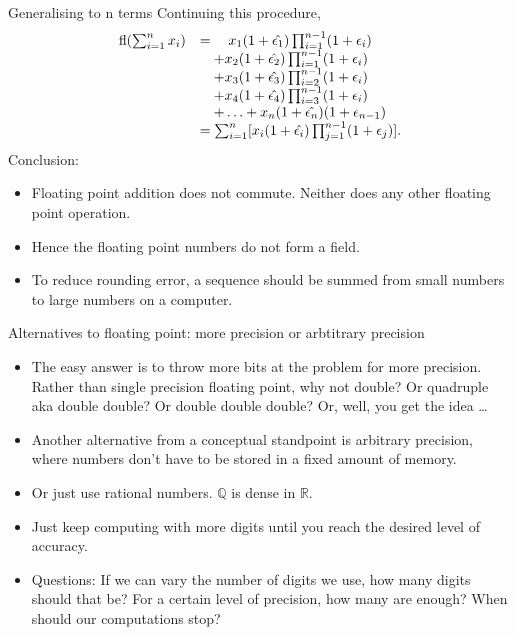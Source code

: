 \documentclass{beamer}
\begin{document}
\begin{frame}{Generalising to n terms}
Continuing this procedure,
\begin{equation*}
\begin{array}{rl}
\text{fl}(\sum_{i=1}^n x_i) &= \quad x_1 (1 + \hat{\epsilon_1}) \prod_{i=1}^{n-1} (1 + \epsilon_i) \\
&\quad + x_2 (1 + \hat{\epsilon_2}) \prod_{i=1}^{n-1} (1 + \epsilon_i) \\
&\quad + x_3 (1 + \hat{\epsilon_3}) \prod_{i=2}^{n-1} (1 + \epsilon_i) \\
&\quad + x_4 (1 + \hat{\epsilon_4}) \prod_{i=3}^{n-1} (1 + \epsilon_i) \\
&\quad + \ldots + x_n (1 + \hat{\epsilon_n}) (1 + \epsilon_{n-1}) \\
&= \sum_{i=1}^n [x_i (1 + \hat{\epsilon_i}) \prod_{j=1}^{n-1} (1 + \epsilon_j)].
\end{array}
\end{equation*}
Conclusion: 
\begin{itemize}
\item Floating point addition does not commute. Neither does any other floating point
			operation.
\item Hence the floating point numbers do not form a field.
\item To reduce rounding error, a sequence should be summed from small numbers to large numbers on a
computer.
\end{itemize}
\end{frame}


\begin{frame}{Alternatives to floating point: more precision or arbtitrary precision}
\begin{itemize}
\item The easy answer is to throw more bits at the problem for more precision. Rather than single precision 				floating point, why not double? Or quadruple aka double double? Or double double double? Or, well, you 				get the idea \ldots
\item Another alternative from a conceptual standpoint is arbitrary precision, where numbers don't have to be
			stored in a fixed amount of memory.
\item Or just use rational numbers. $\mathbb{Q}$ is dense in $\mathbb{R}$.
\item Just keep computing with more digits until you reach the desired level of accuracy.
\item Questions: If we can vary the number of digits we use, how many digits should that be? For a certain
			level of precision, how many are enough? When should our computations stop?
\end{itemize}
\end{frame}
\end{document}
